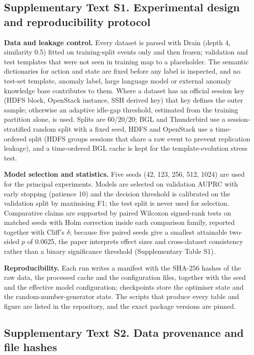 \documentclass[11pt,a4paper]{article}
\begin{document}
\clearpage
\subsection*{Supplementary Text S1. Experimental design and reproducibility protocol}

\noindent\textbf{Data and leakage control.} Every dataset is parsed with Drain
(depth 4, similarity 0.5) fitted on training-split events only and then frozen;
validation and test templates that were not seen in training map to a placeholder. The
semantic dictionaries for action and state are fixed before any label is inspected, and
no test-set template, anomaly label, large language model or external anomaly knowledge
base contributes to them. Where a dataset has an official session key (HDFS block,
OpenStack instance, SSH derived key) that key defines the outer sample; otherwise an
adaptive idle-gap threshold, estimated from the training partition alone, is used.
Splits are 60/20/20; BGL and Thunderbird use a session-stratified random split with a
fixed seed, HDFS and OpenStack use a time-ordered split (HDFS groups sessions that share
a raw event to prevent replication leakage), and a time-ordered BGL cache is kept for
the template-evolution stress test.

\noindent\textbf{Model selection and statistics.} Five seeds (42, 123, 256, 512,
1024) are used for the principal experiments. Models are selected on validation AUPRC
with early stopping (patience 10) and the decision threshold is calibrated on the
validation split by maximising F1; the test split is never used for selection.
Comparative claims are supported by paired Wilcoxon signed-rank tests on matched seeds
with Holm correction inside each comparison family, reported together with Cliff's
$\delta$; because five paired seeds give a smallest attainable two-sided $p$ of 0.0625,
the paper interprets effect sizes and cross-dataset consistency rather than a binary
significance threshold (Supplementary Table S1).

\noindent\textbf{Reproducibility.} Each run writes a manifest with the SHA-256
hashes of the raw data, the processed cache and the configuration files, together with
the seed and the effective model configuration; checkpoints store the optimiser state
and the random-number-generator state. The scripts that produce every table and figure
are listed in the repository, and the exact package versions are pinned.

\clearpage
\subsection*{Supplementary Text S2. Data provenance and file hashes}
\end{document}
